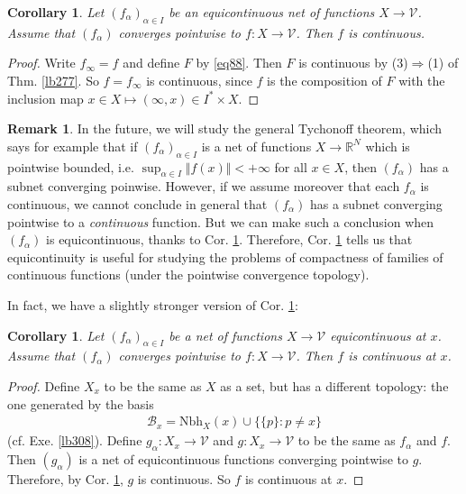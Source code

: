 \documentclass[12pt,b5paper,notitlepage]{article}
\theoremstyle{definition}
\newtheorem{rem}[df]{Remark}
\theoremstyle{plain}
\newtheorem{co}[df]{Corollary}
\newcommand{\mc}{\mathcal}
\newcommand{\Rbb}{\mathbb R}
\newcommand{\Nbh}{\mathrm{Nbh}}
\numberwithin{equation}{section}
\begin{document}
\begin{co}\label{lb303}
Let $(f_\alpha)_{\alpha\in I}$ be an equicontinuous net of functions $X\rightarrow\mc V$. Assume that $(f_\alpha)$ converges pointwise to $f:X\rightarrow\mc V$. Then $f$ is continuous.
\end{co}

\begin{proof}
Write $f_\infty=f$ and define $F$ by \eqref{eq88}. Then $F$ is continuous by (3)$\Rightarrow$(1) of Thm. \ref{lb277}. So $f=f_\infty$ is continuous, since $f$ is the composition of $F$ with the inclusion map $x\in X\mapsto (\infty,x)\in I^*\times X$.
\end{proof}






\begin{rem}\label{lb304}
In the future, we will study the general Tychonoff theorem, which says for example that if $(f_\alpha)_{\alpha\in I}$ is a net of functions $X\rightarrow\Rbb^N$ which is pointwise bounded, i.e. $\sup_{\alpha\in I}\Vert f(x)\Vert<+\infty$ for all $x\in X$, then $(f_\alpha)$ has a subnet converging poinwise. However, if we assume moreover that each $f_\alpha$ is continuous, we cannot conclude in general that $(f_\alpha)$ has a subnet converging pointwise to a \textit{continuous} function. But we can make such a conclusion when $(f_\alpha)$ is equicontinuous, thanks to Cor. \ref{lb303}. Therefore, Cor. \ref{lb303} tells us that equicontinuity is useful for studying the problems of compactness of families of continuous functions (under the pointwise convergence topology).
\end{rem}


In fact, we have a slightly stronger version of Cor. \ref{lb303}:

\begin{co}\label{lb310}
Let $(f_\alpha)_{\alpha\in I}$ be a net of functions $X\rightarrow\mc V$ equicontinuous at $x$. Assume that $(f_\alpha)$ converges pointwise to $f:X\rightarrow\mc V$. Then $f$ is continuous at $x$.
\end{co}

\begin{proof}
Define $X_x$ to be the same as $X$ as a set, but has a different topology: the one generated by the basis
\begin{align*}
\mc B_x=\Nbh_X(x)\cup\big\{\{p\}:p\neq x\big\}
\end{align*}
(cf. Exe. \ref{lb308}). Define $g_\alpha:X_x\rightarrow\mc V$ and $g:X_x\rightarrow\mc V$ to be the same as $f_\alpha$ and $f$. Then $(g_\alpha)$ is a net of equicontinuous functions converging pointwise to $g$. Therefore, by Cor. \ref{lb303}, $g$ is continuous. So $f$ is continuous at $x$. 
\end{proof}
\end{document}

